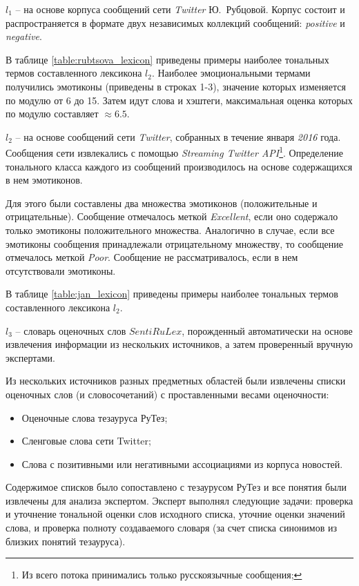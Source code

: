 $l_1$ -- на основе корпуса сообщений сети {\it Twitter} Ю.~Рубцовой.
Корпус состоит и распространяется в формате двух независимых коллекций
сообщений: {\it positive} и {\it negative}.

В таблице \ref{table:rubtsova_lexicon} приведены примеры наиболее тональных
термов составленного лексикона $l_2$.
Наиболее эмоциональными термами получились эмотиконы (приведены в строках 1-3),
значение которых изменяется по модулю от 6 до 15.
Затем идут слова и хэштеги, максимальная оценка которых по модулю
составляет $\approx6.5$.


$l_2$ -- на основе сообщений сети {\it Twitter}, собранных в течение января {\it 2016} года.
Сообщения сети извлекались с помощью {\it Streaming Twitter API}\footnote{
    Из всего потока принимались только русскоязычные сообщения;
}.
Определение тонального класса каждого из сообщений производилось на
основе содержащихся в нем эмотиконов.

Для этого были составлены два множества эмотиконов (положительные и отрицательные).
Сообщение отмечалось меткой {\it Excellent}, если оно содержало
только эмотиконы положительного множества.
Аналогично в случае, если все эмотиконы сообщения принадлежали
отрицательному множеству, то сообщение отмечалось меткой {\it Poor}.
Сообщение не рассматривалось, если в нем отсутствовали эмотиконы.

В таблице \ref{table:jan_lexicon} приведены примеры наиболее тональных термов
составленного лексикона $l_2$.


$l_3$ -- словарь оценочных слов $SentiRuLex$, порожденный
автоматически на основе извлечения информации из нескольких источников,
а затем проверенный вручную экспертами.

Из нескольких источников разных предметных областей были
извлечены списки оценочных слов (и словосочетаний) с проставленными
весами оценочности:
\begin{itemize}
    \item Оценочные слова тезауруса РуТез;
    \item Сленговые слова сети Twitter;
    \item Слова с позитивными или негативными ассоциациями из корпуса новостей.
\end{itemize}
Содержимое списков было сопоставлено с тезаурусом РуТез и все понятия
были извлечены для анализа экспертом.
Эксперт выполнял следующие задачи:
проверка и уточнение тональной оценки слов исходного списка,
уточние оценки значений слова,
и проверка полноту создаваемого словаря (за счет списка синонимов из
близких понятий тезауруса).

